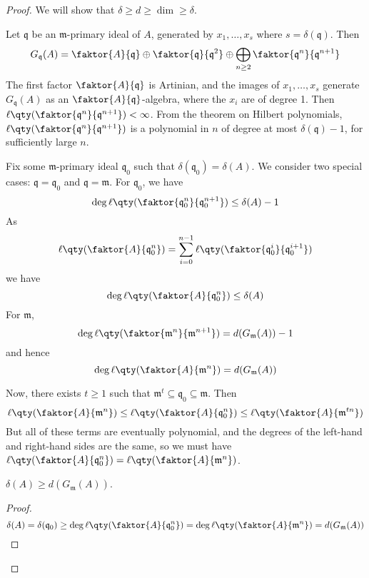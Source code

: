 \begin{proof}
    We will show that \( \delta \geq d \geq \dim \geq \delta \).

    Let \( \mathfrak q \) be an \( \mathfrak m \)-primary ideal of \( A \), generated by \( x_1, \dots, x_s \) where \( s = \delta(\mathfrak q) \).
    Then
    \[ G_{\mathfrak q}(A) = \faktor{A}{\mathfrak q} \oplus \faktor{\mathfrak q}{\mathfrak q^2} \oplus \bigoplus_{n \geq 2} \faktor{\mathfrak q^n}{\mathfrak q^{n+1}} \]
    The first factor \( \faktor{A}{\mathfrak q} \) is Artinian, and the images of \( x_1, \dots, x_s \) generate \( G_{\mathfrak q}(A) \) as an \( \faktor{A}{\mathfrak q} \)-algebra, where the \( x_i \) are of degree 1.
    Then \( \ell\qty(\faktor{\mathfrak q^n}{\mathfrak q^{n+1}}) < \infty \).
    From the theorem on Hilbert polynomials, \( \ell\qty(\faktor{\mathfrak q^n}{\mathfrak q^{n+1}}) \) is a polynomial in \( n \) of degree at most \( \delta(\mathfrak q) - 1 \), for sufficiently large \( n \).

    Fix some \( \mathfrak m \)-primary ideal \( \mathfrak q_0 \) such that \( \delta(\mathfrak q_0) = \delta(A) \).
    We consider two special cases: \( \mathfrak q = \mathfrak q_0 \) and \( \mathfrak q = \mathfrak m \).
    For \( \mathfrak q_0 \), we have
    \[ \deg \ell\qty(\faktor{\mathfrak q_0^n}{\mathfrak q_0^{n+1}}) \leq \delta(A) - 1 \]
    As
    \[ \ell\qty(\faktor{A}{\mathfrak q_0^n}) = \sum_{i=0}^{n-1} \ell\qty(\faktor{\mathfrak q_0^i}{\mathfrak q_0^{i+1}}) \]
    we have
    \[ \deg \ell\qty(\faktor{A}{\mathfrak q_0^n}) \leq \delta(A) \]
    For \( \mathfrak m \),
    \[ \deg \ell\qty(\faktor{\mathfrak m^n}{\mathfrak m^{n+1}}) = d(G_{\mathfrak m}(A)) - 1 \]
    and hence
    \[ \deg \ell\qty(\faktor{A}{\mathfrak m^n}) = d(G_{\mathfrak m}(A)) \]

    Now, there exists \( t \geq 1 \) such that \( \mathfrak m^t \subseteq \mathfrak q_0 \subseteq \mathfrak m \).
    Then
    \[ \ell\qty(\faktor{A}{\mathfrak m^n}) \leq \ell\qty(\faktor{A}{\mathfrak q_0^n}) \leq \ell\qty(\faktor{A}{\mathfrak m^{tn}}) \]
    But all of these terms are eventually polynomial, and the degrees of the left-hand and right-hand sides are the same, so we must have \( \ell\qty(\faktor{A}{\mathfrak q_0^n}) = \ell\qty(\faktor{A}{\mathfrak m^n}) \).

    \begin{proposition}
        \( \delta(A) \geq d(G_{\mathfrak m}(A)) \).
    \end{proposition}
    \begin{proof}
        \[ \delta(A) = \delta(\mathfrak q_0) \geq \deg \ell\qty(\faktor{A}{\mathfrak q_0^n}) = \deg \ell\qty(\faktor{A}{\mathfrak m^n}) = d(G_{\mathfrak m}(A)) \]
    \end{proof}


\end{proof}
